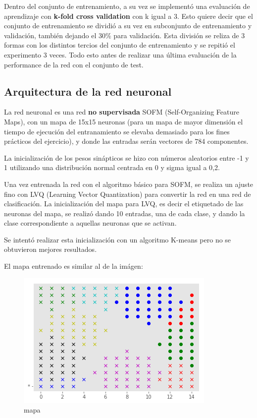 \documentclass[
]{article}
\begin{document}
Dentro del conjunto de entrenamiento, a su vez se implementó una
evaluación de aprendizaje con \textbf{k-fold cross validation} con k
igual a 3. Esto quiere decir que el conjunto de entrenamiento se dividió
a su vez en subconjunto de entrenamiento y validación, también dejando
el 30\% para validación. Esta división se reliza de 3 formas con los
distintos tercios del conjunto de entrenamiento y se repitió el
experimento 3 veces. Todo esto antes de realizar una última evaluación
de la performance de la red con el conjunto de test.

\hypertarget{arquitectura-de-la-red-neuronal}{%
\subsection{Arquitectura de la red
neuronal}\label{arquitectura-de-la-red-neuronal}}

La red neuronal es una red \textbf{no supervisada} SOFM (Self-Organizing
Feature Maps), con un mapa de 15x15 neuronas (para un mapa de mayor
dimensión el tiempo de ejecución del entranamiento se elevaba demasiado
para los fines prácticos del ejercicio), y donde las entradas serán
vectores de 784 componentes.

La inicialización de los pesos sinápticos se hizo con números aleatorios
entre -1 y 1 utilizando una distribución normal centrada en 0 y sigma
igual a 0,2.

Una vez entrenada la red con el algoritmo básico para SOFM, se realiza
un ajuste fino con LVQ (Learning Vector Quantization) para convertir la
red en una red de clasificación. La inicialización del mapa para LVQ, es
decir el etiquetado de las neuronas del mapa, se realizó dando 10
entradas, una de cada clase, y dando la clase correspondiente a aquellas
neuronas que se activan.

Se intentó realizar esta inicialización con un algoritmo K-means pero no
se obtuvieron mejores resultados.

El mapa entrenado es similar al de la imágen:

\begin{figure}
\centering
\includegraphics{kohonen_tests/map_kohonen_90-61.png}
\caption{mapa}
\end{figure}
\end{document}
